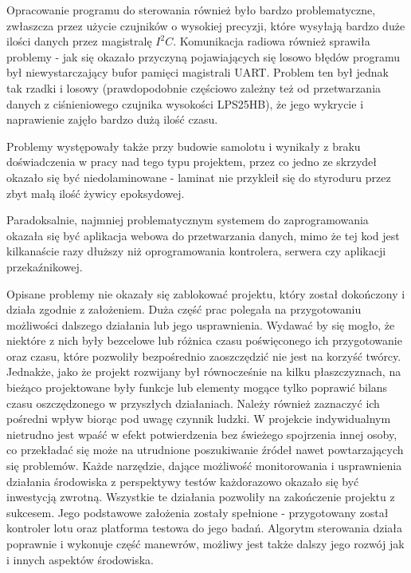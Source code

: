 \documentclass[12pt, a4paper]{article}
\begin{document}
Opracowanie programu do sterowania również było bardzo problematyczne, zwłaszcza przez użycie czujników o wysokiej precyzji, które wysyłają bardzo duże ilości danych przez magistralę $I^2C$. Komunikacja radiowa również sprawiła problemy - jak się okazało przyczyną pojawiających się losowo błędów programu był niewystarczający bufor pamięci magistrali UART. Problem ten był jednak tak rzadki i losowy (prawdopodobnie częściowo zależny też od przetwarzania danych z ciśnieniowego czujnika wysokości LPS25HB), że jego wykrycie i naprawienie zajęło bardzo dużą ilość czasu.

Problemy występowały także przy budowie samolotu i wynikały z braku doświadczenia w pracy nad tego typu projektem, przez co jedno ze skrzydeł okazało się być niedolaminowane - laminat nie przykleił się do styroduru przez zbyt małą ilość żywicy epoksydowej.

Paradoksalnie, najmniej problematycznym systemem do zaprogramowania okazała się być aplikacja webowa do przetwarzania danych, mimo że tej kod jest kilkanaście razy dłuższy niż oprogramowania kontrolera, serwera czy aplikacji przekaźnikowej.

Opisane problemy nie okazały się zablokować projektu, który został dokończony i działa zgodnie z założeniem. Duża część prac polegała na przygotowaniu możliwości dalszego działania lub jego usprawnienia. Wydawać by się mogło, że niektóre z nich były bezcelowe lub różnica czasu poświęconego ich przygotowanie oraz czasu, które pozwoliły bezpośrednio zaoszczędzić nie jest na korzyść twórcy. Jednakże, jako że projekt rozwijany był równocześnie na kilku płaszczyznach, na bieżąco projektowane były funkcje lub elementy mogące tylko poprawić bilans czasu oszczędzonego w przyszłych działaniach. Należy również zaznaczyć ich pośredni wpływ biorąc pod uwagę czynnik ludzki. W projekcie indywidualnym nietrudno jest wpaść w efekt potwierdzenia bez świeżego spojrzenia innej osoby, co przekładać się może na utrudnione poszukiwanie źródeł nawet powtarzających się problemów. Każde narzędzie, dające możliwość monitorowania i usprawnienia działania środowiska z perspektywy testów każdorazowo okazało się być inwestycją zwrotną. Wszystkie te działania pozwoliły na zakończenie projektu z sukcesem. Jego podstawowe założenia zostały spełnione -  przygotowany został kontroler lotu oraz platforma testowa do jego badań. Algorytm sterowania działa poprawnie i wykonuje część manewrów, możliwy jest także dalszy jego rozwój jak i innych aspektów środowiska.
\end{document}
